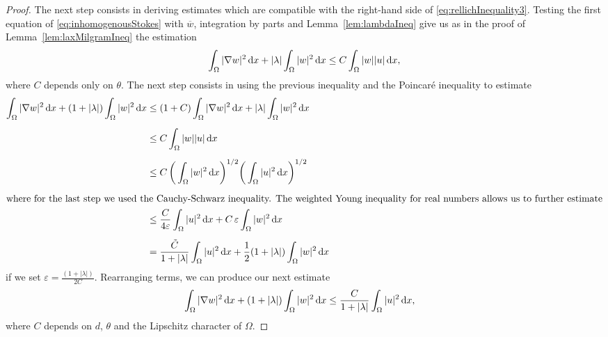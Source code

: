 \begin{proof}
  The next step consists in deriving estimates which are compatible with the right-hand side of \eqref{eq:rellichInequality3}.
  Testing the first equation of \eqref{eq:inhomogenousStokes} with $\overline w$, integration by parts and Lemma~\ref{lem:lambdaIneq} give us as in the proof of Lemma~\ref{lem:laxMilgramIneq} the estimation
  \begin{align*}
    \int_\Omega |\nabla w|^2 \, {\operatorname{d}\!{x}} + |\lambda| \int_\Omega |w|^2 \, {\operatorname{d}\!{x}} \leq C \int_\Omega |w| |u| \, {\operatorname{d}\!{x}},
  \end{align*}
  where $C$ depends only on $\theta$.
  The next step consists in using the previous inequality and the Poincar\'{e} inequality to estimate
  \begin{align*}
    \int_\Omega |\nabla w|^2 \d x + (1 + |\lambda| ) \int_\Omega |w|^2 \d x 
    &\leq  (1 + C) \int_\Omega |\nabla w|^2 \d x + |\lambda| \int_\Omega |w|^2 \d x \\[0.5em]
    &\leq C \int_\Omega |w| |u| \d x \\[0.5em]
    &\leq C \, \bigg( \int_\Omega |w|^2 \d x \bigg)^{1/2} \bigg( \int_\Omega |u|^2 \d x \bigg)^{1/2}\\[0.5em]
    \intertext{where for the last step we used the Cauchy-Schwarz inequality. The weighted Young inequality for real numbers allows us to further estimate}
    &\leq \frac{C}{4\varepsilon} \int_\Omega |u|^2 \d x + C \, \varepsilon \int_\Omega |w|^2 \d x \\[0.5em]
    &= \frac{\tilde C}{1 + |\lambda|} \int_\Omega |u|^2 \d x + \frac{1}{2} ( 1 + |\lambda| ) \int_\Omega |w|^2 \d x
  \end{align*}
  if we set $\varepsilon = \frac{(1 + |\lambda|)}{2 C}$.
  Rearranging terms, we can produce our next estimate
  \begin{align}
    \int_\Omega |\nabla w|^2 \, {\operatorname{d}\!{x}} + ( 1 + |\lambda| ) \int_\Omega |w|^2 \, {\operatorname{d}\!{x}}
    &\leq \frac{C}{1 + |\lambda|} \int_\Omega |u|^2 \, {\operatorname{d}\!{x}},\label{eq:w2lambdaEstimate}
  \end{align}
  where $C$ depends on $d$, $\theta$ and the Lipschitz character of $\Omega$.


\end{proof}
